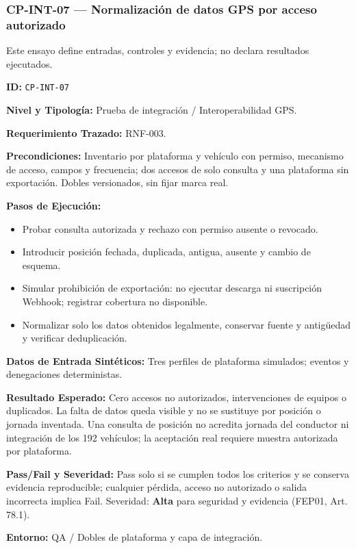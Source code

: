 \subsubsection*{CP-INT-07 — Normalización de datos GPS por acceso autorizado}\label{sec:9-cp-int-07}

Este ensayo define entradas, controles y evidencia; no declara resultados ejecutados.

\par\noindent\textbf{ID:} \texttt{CP-\allowbreak{}INT-\allowbreak{}07}\par
\par\noindent\textbf{Nivel y Tipología:} Prueba de integración / Interoperabilidad GPS.\par
\par\noindent\textbf{Requerimiento Trazado:} RNF-003.\par
\par\noindent\textbf{Precondiciones:} Inventario por plataforma y vehículo con permiso, mecanismo de acceso, campos y frecuencia; dos accesos de solo consulta y una plataforma sin exportación. Dobles versionados, sin fijar marca real.\par
\par\noindent\textbf{Pasos de Ejecución:}\par
\begin{itemize}
\item Probar consulta autorizada y rechazo con permiso ausente o revocado.
\item Introducir posición fechada, duplicada, antigua, ausente y cambio de esquema.
\item Simular prohibición de exportación: no ejecutar descarga ni suscripción Webhook; registrar cobertura no disponible.
\item Normalizar solo los datos obtenidos legalmente, conservar fuente y antigüedad y verificar deduplicación.
\end{itemize}

\par\noindent\textbf{Datos de Entrada Sintéticos:} Tres perfiles de plataforma simulados; eventos y denegaciones deterministas.\par
\par\noindent\textbf{Resultado Esperado:} Cero accesos no autorizados, intervenciones de equipos o duplicados. La falta de datos queda visible y no se sustituye por posición o jornada inventada. Una consulta de posición no acredita jornada del conductor ni integración de los 192 vehículos; la aceptación real requiere muestra autorizada por plataforma.\par
\par\noindent\textbf{Pass/Fail y Severidad:} Pass solo si se cumplen todos los criterios y se conserva evidencia reproducible; cualquier pérdida, acceso no autorizado o salida incorrecta implica Fail. Severidad: \textbf{Alta} para seguridad y evidencia (FEP01, Art. 78.1).\par
\par\noindent\textbf{Entorno:} QA / Dobles de plataforma y capa de integración.\par


